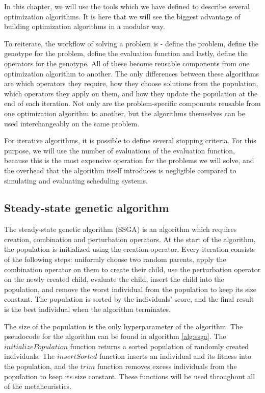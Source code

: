 In this chapter, we will use the tools which we have defined to describe several optimization algorithms. It is here that we will see the biggest advantage of building optimization algorithms in a modular way. 

To reiterate, the workflow of solving a problem is - define the problem, define the genotype for the problem, define the evaluation function and lastly, define the operators for the genotype. All of these become reusable components from one optimization algorithm to another. The only differences between these algorithms are which operators they require, how they choose solutions from the population, which operators they apply on them, and how they update the population at the end of each iteration. Not only are the problem-specific components reusable from one optimization algorithm to another, but the algorithms themselves can be used interchangeably on the same problem.

For iterative algorithms, it is possible to define several stopping criteria. For this purpose, we will use the number of evaluations of the evaluation function, because this is the most expensive operation for the problems we will solve, and the overhead that the algorithm itself introduces is negligible compared to simulating and evaluating scheduling systems.

\subsection{Steady-state genetic algorithm}
\label{sec:ssga}

The steady-state genetic algorithm (SSGA) \citep{ssga} is an algorithm which requires creation, combination and perturbation operators. At the start of the algorithm, the population is initialized using the creation operator. Every iteration consists of the following steps: uniformly choose two random parents, apply the combination operator on them to create their child, use the perturbation operator on the newly created child, evaluate the child, insert the child into the population, and remove the worst individual from the population to keep its size constant. The population is sorted by the individuals' score, and the final result is the best individual when the algorithm terminates.

The size of the population is the only hyperparameter of the algorithm. The pseudocode for the algorithm can be found in algorithm \ref{alg:ssga}. The $initializePopulation$ function returns a sorted population of randomly created individuals. The $insertSorted$ function inserts an individual and its fitness into the population, and the $trim$ function removes excess individuals from the population to keep its size constant. These functions will be used throughout all of the metaheuristics.

